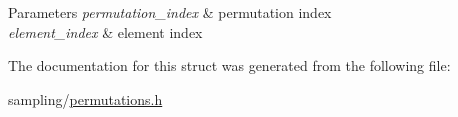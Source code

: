 \begin{DoxyParams}{\-Parameters}
{\em permutation\-\_\-index} & permutation index \\
\hline
{\em element\-\_\-index} & element index \\
\hline
\end{DoxyParams}


\-The documentation for this struct was generated from the following file\-:\begin{DoxyCompactItemize}
\item 
sampling/\hyperlink{permutations_8h}{permutations.\-h}\end{DoxyCompactItemize}
